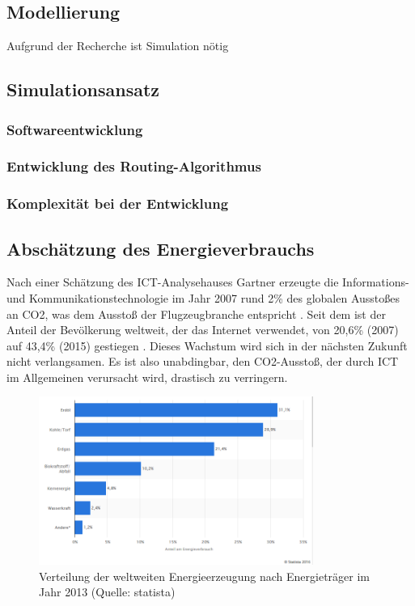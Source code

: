 \documentclass[12pt,titlepage]{article}
\begin{document}
\subsection{Modellierung}
Aufgrund der Recherche ist Simulation nötig

\subsection{Simulationsansatz}

\subsubsection{Softwareentwicklung}

\subsubsection{Entwicklung des Routing-Algorithmus}

\subsubsection{Komplexität bei der Entwicklung}

\subsection{Abschätzung des Energieverbrauchs}


Nach einer Schätzung des ICT-Analysehauses Gartner erzeugte die Informations- und Kommunikationstechnologie im Jahr 2007 rund 2\% des globalen Ausstoßes an CO2, was dem Ausstoß der Flugzeugbranche entspricht \cite{gartner}. Seit dem ist der Anteil der Bevölkerung weltweit, der das Internet verwendet, von 20,6\% (2007) auf 43,4\% (2015) gestiegen \cite{itu}. Dieses Wachstum wird sich in der nächsten Zukunft nicht verlangsamen. Es ist also unabdingbar, den CO2-Ausstoß, der durch ICT im Allgemeinen verursacht wird, drastisch zu verringern.

\begin{figure}[!ht]
	\centering
	\includegraphics[width=0.8\textwidth]{statista}
	\caption{Verteilung der weltweiten Energieerzeugung nach Energieträger im Jahr 2013 (Quelle: statista)}
	\label{fig:statista}
\end{figure}
\end{document}
